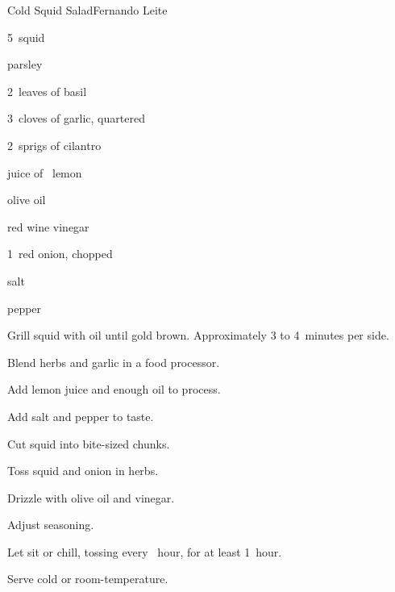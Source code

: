 \begin{recipe}{Cold Squid Salad}{Fernando Leite}{}

\begin{ingredients}
\item 5~squid
\item \C{\quarter} parsley
\item 2~leaves of basil
\item 3~cloves of garlic, quartered
\item 2~sprigs of cilantro
\item juice of \half~lemon
\item olive oil
\item red wine vinegar
\item 1~red onion, chopped
\item salt
\item pepper
\end{ingredients}

\begin{directions}
\item Grill squid with oil until gold brown. Approximately 3 to 4~minutes per side.
\item Blend herbs and garlic in a food processor.
\item Add lemon juice and enough oil to process.
\item Add salt and pepper to taste.
\item Cut squid into bite-sized chunks.
\item Toss squid and onion in herbs.
\item Drizzle with olive oil and vinegar.
\item Adjust seasoning.
\item Let sit or chill, tossing every \half~hour, for at least 1~hour.
\item Serve cold or room-temperature.
\end{directions}

\end{recipe}
